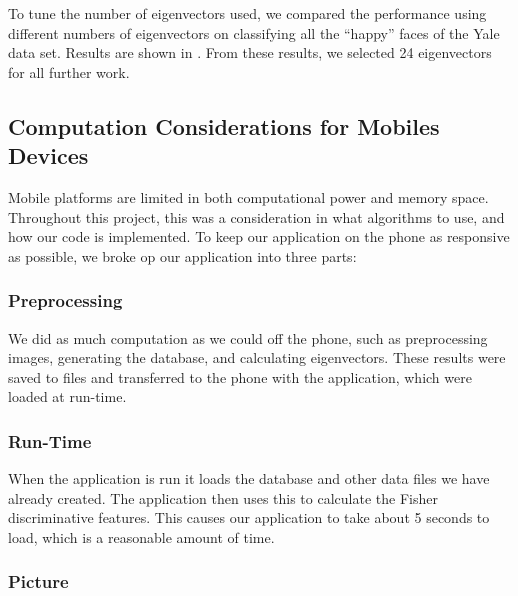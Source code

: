 To tune the number of eigenvectors used, we compared the performance
using different numbers of eigenvectors on classifying all the
``happy'' faces of the Yale data set.  Results are shown in
.  From these results, we selected 24
eigenvectors for all further work.




\subsection{Computation Considerations for Mobiles Devices}

Mobile platforms are limited in both computational power and memory
space.  Throughout this project, this was a consideration in what
algorithms to use, and how our code is implemented.  To keep our
application on the phone as responsive as possible, we broke op our
application into three parts:

\subsubsection{Preprocessing}

We did as much computation as we could off the phone, such as
preprocessing images, generating the database, and calculating
eigenvectors.  These results were saved to files and transferred to
the phone with the application, which were loaded at run-time.

\subsubsection{Run-Time}

When the application is run it loads the database and other data files
we have already created.  The application then uses this to calculate
the Fisher discriminative features.  This causes our application to
take about 5 seconds to load, which is a reasonable amount of time.

\subsubsection{Picture}

